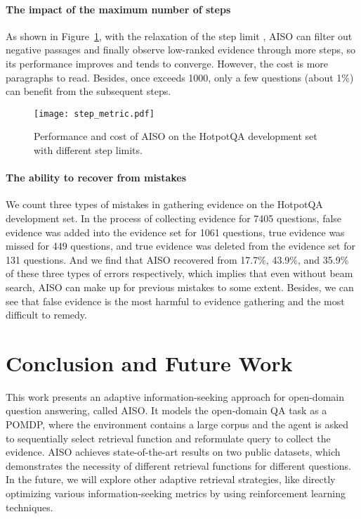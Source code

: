 \documentclass[11pt]{article}
\begin{document}
\paragraph{The impact of the maximum number of steps}
As shown in Figure~\ref{fig:step_metric}, with the relaxation of the step limit , AISO can filter out negative passages and finally observe low-ranked evidence through more steps, so its performance improves and tends to converge.
However, the cost is more paragraphs to read.
Besides, once  exceeds 1000, only a few questions (about 1\%) can benefit from the subsequent steps.

\begin{figure}
    \centering
    \texttt{[image: step\_metric.pdf]}
    \caption{Performance and cost of AISO on the HotpotQA development set with different step limits.}
    \label{fig:step_metric}
\end{figure}

\paragraph{The ability to recover from mistakes}
We count three types of mistakes in gathering evidence on the HotpotQA development set. 
In the process of collecting evidence for 7405 questions, false evidence was added into the evidence set for 1061 questions, true evidence was missed for 449 questions, and true evidence was deleted from the evidence set for 131 questions.
And we find that AISO recovered from 17.7\%, 43.9\%, and 35.9\% of these three types of errors respectively, which implies that even without beam search, AISO can make up for previous mistakes to some extent.
Besides, we can see that false evidence is the most harmful to evidence gathering and the most difficult to remedy.


\section{Conclusion and Future Work}
This work presents an adaptive information-seeking approach for open-domain question answering, called AISO. 
It models the open-domain QA task as a POMDP, where the environment contains a large corpus and the agent is asked to sequentially select retrieval function and reformulate query to collect the evidence. 
AISO achieves state-of-the-art results on two public datasets, which demonstrates the necessity of different retrieval functions for different questions. 
In the future, we will explore other adaptive retrieval strategies, like directly optimizing various information-seeking metrics by using reinforcement learning techniques.
\end{document}
